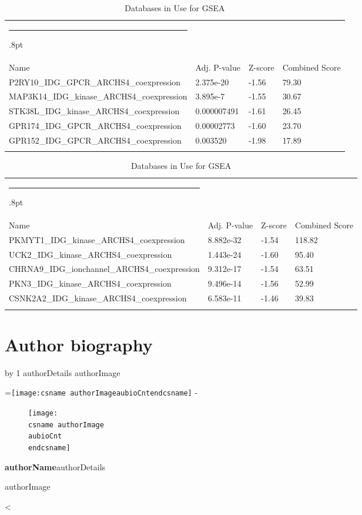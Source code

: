 \documentclass[3p,authoryear,preprint,12pt]{elsarticle}
\makeatletter
\newcounter{aubio}
\newcommand{\checkheight}[1]{%
  \par \penalty-100\begingroup%
  \setbox8=\hbox{#1}%
  \setlength{\dimen@}{\ht8}%
  \dimen@ii\pagegoal \advance\dimen@ii-\pagetotal
  \ifdim \dimen@>\dimen@ii
    \break
  \fi\endgroup}
\def\printBio{%
  \@tempcnta=0
   \loop
     \advance \@tempcnta by 1
     \def\aubioCnt{\the\@tempcnta}
     \setlength{\intextsep}{0pt}%
     \setlength{\columnsep}{10pt}%
     \newbox\boxa%
     \setbox\boxa\vbox{\csname authorDetails\aubioCnt\endcsname}
     \expandafter\ifx\csname authorImage\aubioCnt\endcsname\relax%
      \else%
       \checkheight{\texttt{[image: \\csname authorImage\\aubioCnt\\endcsname]}}
        \begin{wrapfigure}{l}{25mm}
         \texttt{[image: \\csname authorImage\\aubioCnt\\endcsname]}%
        \end{wrapfigure}\par
      \fi
     {\parindent0pt\textbf{\csname authorName\aubioCnt\endcsname}\csname authorDetails\aubioCnt\endcsname \par\bigskip%
     \expandafter\ifx\csname authorImage\aubioCnt\endcsname\relax\else%
      \ifdim\the\ht\boxa < 90pt\vskip\dimexpr(90pt -\the\ht\boxa-1pc)\fi%
     \fi}%
      \ifnum\@tempcnta < \theaubio
   \repeat
   }
\def\hlinewd#1{%
  \noalign{\ifnum0=`}\fi\hrule \@height #1%
  \futurelet\reserved@a\@xhline}
\def\tbltoprule{\hlinewd{.8pt}\\[-12pt]}
\def\tblbottomrule{\noalign{\vspace*{6pt}}\hline\noalign{\vspace*{2pt}}}
\def\tblmidrule{\noalign{\vspace*{6pt}}\hline\noalign{\vspace*{2pt}}}
\makeatother
\begin{document}
\begin{table*}[!htbp]
	\caption{{Databases in Use for GSEA} }
	\label{tw-de478ae31cc6}
	\def\arraystretch{1}
	\ignorespaces 
	\centering 
	\begin{tabulary}{\linewidth}{p{\dimexpr.65\tabcolsep}p{\dimexpr.15\tabcolsep}p{\dimexpr.1\tabcolsep}p{\dimexpr.1\tabcolsep}}
		\tbltoprule Name & Adj. P-value & Z-score & Combined Score\\
		\tblmidrule
P2RY10\_IDG\_GPCR\_ARCHS4\_coexpression & 2.375e-20 & -1.56 & 79.30 \\
MAP3K14\_IDG\_kinase\_ARCHS4\_coexpression & 3.895e-7 & -1.55 & 30.67 \\
STK38L\_IDG\_kinase\_ARCHS4\_coexpression & 0.000007491 & -1.61 & 26.45 \\
GPR174\_IDG\_GPCR\_ARCHS4\_coexpression & 0.00002773 & -1.60 & 23.70 \\
GPR152\_IDG\_GPCR\_ARCHS4\_coexpression & 0.003520 & -1.98 & 17.89 \\
		\tblbottomrule
	\end{tabulary}\par 
\end{table*}
\begin{table*}[!htbp]
	\caption{{Databases in Use for GSEA} }
	\label{tw-de478ae31cc6}
	\def\arraystretch{1}
	\ignorespaces 
	\centering 
	\begin{tabulary}{\linewidth}{p{\dimexpr.65\tabcolsep}p{\dimexpr.15\tabcolsep}p{\dimexpr.1\tabcolsep}p{\dimexpr.1\tabcolsep}}
		\tbltoprule Name & Adj. P-value & Z-score & Combined Score\\
		\tblmidrule
PKMYT1\_IDG\_kinase\_ARCHS4\_coexpression & 8.882e-32 & -1.54 & 118.82 \\
UCK2\_IDG\_kinase\_ARCHS4\_coexpression & 1.443e-24 & -1.60 & 95.40 \\
CHRNA9\_IDG\_ionchannel\_ARCHS4\_coexpression & 9.312e-17 & -1.54 & 63.51 \\
PKN3\_IDG\_kinase\_ARCHS4\_coexpression & 9.496e-14 & -1.56 & 52.99 \\
CSNK2A2\_IDG\_kinase\_ARCHS4\_coexpression & 6.583e-11 & -1.46 & 39.83\\
		\tblbottomrule
	\end{tabulary}\par 
\end{table*}








\section*{Author biography}\noindent

\printBio 
\end{document}
